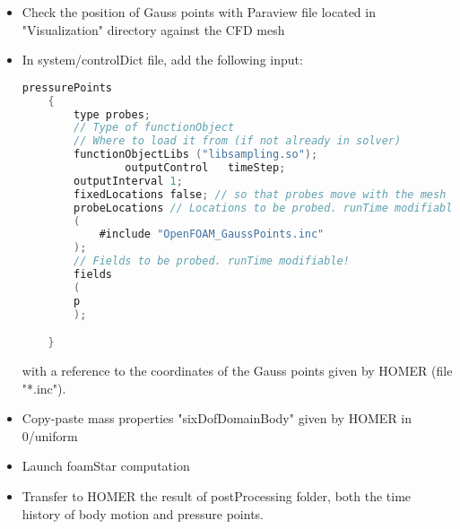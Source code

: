 \begin{itemize}
\item Check the position of Gauss points with Paraview file located in "Visualization" directory against the CFD mesh

\item In system/controlDict file, add the following input:

\begin{lstlisting}[language=C]
    pressurePoints
    {
		type probes; 
		// Type of functionObject
		// Where to load it from (if not already in solver)
		functionObjectLibs ("libsampling.so");
                outputControl   timeStep; 
		outputInterval 1;
		fixedLocations false; // so that probes move with the mesh
		probeLocations // Locations to be probed. runTime modifiable!
		(
			#include "OpenFOAM_GaussPoints.inc"
		);
		// Fields to be probed. runTime modifiable!
		fields
		(
		p
		);

    }
\end{lstlisting}

with a reference to the coordinates of the Gauss points given by HOMER (file "*.inc").

\item Copy-paste mass properties "sixDofDomainBody" given by HOMER in 0/uniform

\item Launch foamStar computation

\item Transfer to HOMER the result of postProcessing folder, both the time history of body motion and pressure points. 

\end{itemize}





